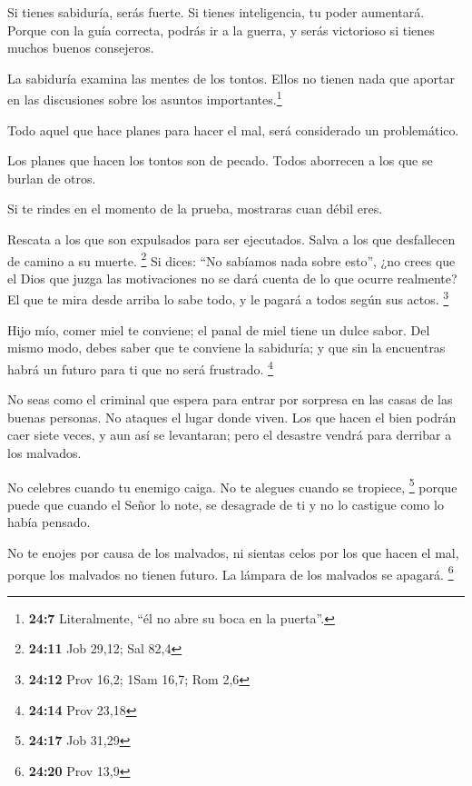  Si tienes sabiduría, serás fuerte. Si tienes
inteligencia, tu poder aumentará.  Porque con la guía
correcta, podrás ir a la guerra, y serás victorioso si tienes muchos
buenos consejeros.

 La sabiduría examina las mentes de los tontos. Ellos no
tienen nada que aportar en las discusiones sobre los asuntos
importantes.\footnote{\textbf{24:7} Literalmente, ``él no abre su boca
  en la puerta''.}

 Todo aquel que hace planes para hacer el mal, será
considerado un problemático.

 Los planes que hacen los tontos son de pecado. Todos
aborrecen a los que se burlan de otros.

 Si te rindes en el momento de la prueba, mostraras cuan
débil eres.

 Rescata a los que son expulsados para ser ejecutados.
Salva a los que desfallecen de camino a su muerte. \footnote{\textbf{24:11}
  Job 29,12; Sal 82,4}  Si dices: ``No sabíamos nada
sobre esto'', ¿no crees que el Dios que juzga las motivaciones no se
dará cuenta de lo que ocurre realmente? El que te mira desde arriba lo
sabe todo, y le pagará a todos según sus actos. \footnote{\textbf{24:12}
  Prov 16,2; 1Sam 16,7; Rom 2,6}

 Hijo mío, comer miel te conviene; el panal de miel tiene
un dulce sabor.  Del mismo modo, debes saber que te
conviene la sabiduría; y que sin la encuentras habrá un futuro para ti
que no será frustrado. \footnote{\textbf{24:14} Prov 23,18}

 No seas como el criminal que espera para entrar por
sorpresa en las casas de las buenas personas. No ataques el lugar donde
viven.  Los que hacen el bien podrán caer siete veces, y
aun así se levantaran; pero el desastre vendrá para derribar a los
malvados.

 No celebres cuando tu enemigo caiga. No te alegues
cuando se tropiece, \footnote{\textbf{24:17} Job 31,29} 
porque puede que cuando el Señor lo note, se desagrade de ti y no lo
castigue como lo había pensado.

 No te enojes por causa de los malvados, ni sientas celos
por los que hacen el mal,  porque los malvados no tienen
futuro. La lámpara de los malvados se apagará. \footnote{\textbf{24:20}
  Prov 13,9}

